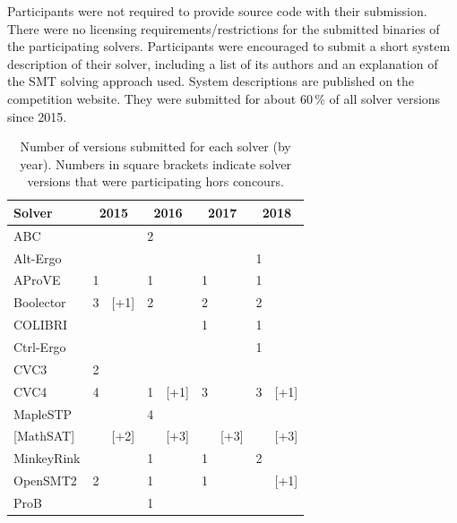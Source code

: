 \documentclass[dvipsnames,table,twoside,11pt]{article}
\begin{document}
Participants were not required to provide source code with their submission.
There were no licensing requirements/restrictions for the submitted binaries
of the participating solvers.
%
Participants were encouraged to submit a short system description
of their solver, including a list of its authors and an explanation of
the SMT solving approach used.  System descriptions are published on
the competition website.  They were submitted for about 60\,\% of all
solver versions since 2015.






\begin{table}
  \caption{Number of versions submitted for each solver (by year).
    Numbers in square brackets indicate solver versions that were
    participating hors concours.}
  \label{table:participants-history}
  \centering
  \begin{tabular}{lr@{\,\,}rr@{\,\,}rr@{\,\,}rr@{\,\,}r}
    \toprule
    Solver & \multicolumn{2}{c}{2015} & \multicolumn{2}{c}{2016} & \multicolumn{2}{c}{2017} & \multicolumn{2}{c}{2018} \\
    \midrule
    ABC               &    &      &  2 &      &    &      &    &      \\
    Alt-Ergo          &    &      &    &      &    &      &  1 &      \\
    AProVE            &  1 &      &  1 &      &  1 &      &  1 &      \\
    Boolector         &  3 & [+1] &  2 &      &  2 &      &  2 &      \\
    COLIBRI           &    &      &    &      &  1 &      &  1 &      \\
    Ctrl-Ergo         &    &      &    &      &    &      &  1 &      \\
    CVC3              &  2 &      &    &      &    &      &    &      \\
    CVC4              &  4 &      &  1 & [+1] &  3 &      &  3 & [+1] \\
    MapleSTP          &    &      &  4 &      &    &      &    &      \\
    {[}MathSAT{]}     &    & [+2] &    & [+3] &    & [+3] &    & [+3] \\
    MinkeyRink        &    &      &  1 &      &  1 &      &  2 &      \\
    OpenSMT2          &  2 &      &  1 &      &  1 &      &    & [+1] \\
    ProB              &    &      &  1 &      &    &      &    &      \\

\end{tabular}
\end{table}
\end{document}
